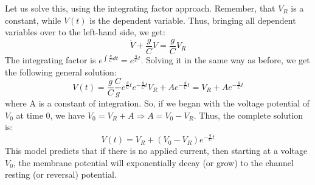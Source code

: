 \documentclass[11pt]{book}
\begin{document}
Let us solve this, using the integrating factor approach. Remember, that $V_R$ is a constant, while $V(t)$ is the dependent variable. Thus, bringing all dependent variables over to the left-hand side, we get:
$$ \dot V + \frac{g}{C} V = \frac{g}{C} V_R$$
The integrating factor is $e^{\int \frac{g}{C}dt} = e^{\frac{g}{C}t}$. Solving it in the same way as before, we get the following general solution:
$$ V(t) = \frac{g}{C}\frac{C}{g}e^{\frac{g}{C}t}e^{-\frac{g}{C}t}V_R + Ae^{-\frac{g}{C}t} = V_R + Ae^{-\frac{g}{C}t}$$
where A is a constant of integration. So, if we began with the voltage potential of $V_0$ at time 0, we have $V_0 = V_R + A \Rightarrow A = V_0-V_R$. Thus, the complete solution is:
\begin{equation}
V(t) = V_R + (V_0-V_R)e^{-\frac{g}{C}t}
\end{equation}
This model predicts that if there is no applied current, then starting at a voltage $V_0$, the membrane potential will exponentially decay (or grow) to the channel resting (or reversal) potential.

\end{document}
